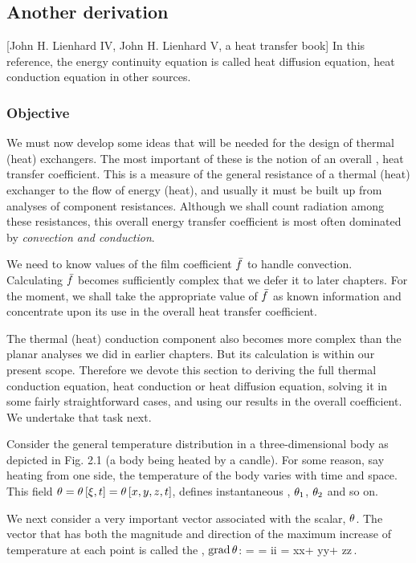 \subsection{Another derivation}
[John H. Lienhard IV, John H. Lienhard V, a heat transfer book] In this reference, the energy continuity equation is called heat diffusion equation, \aka heat conduction equation in other sources.


\subsubsection{Objective}
We must now develop some ideas that will be needed for the design of thermal (heat) exchangers. The most important of these is the notion of an overall , \aka heat transfer coefficient. This is a measure of the general resistance of a thermal (heat) exchanger to the flow of energy (heat), and usually it must be built up from analyses of component resistances. Although we shall count radiation among these resistances, this overall energy transfer coefficient is most often dominated by \emph{convection and conduction}.

We need to know values of the film coefficient $\bar{f}$ to handle convection. Calculating $\bar{f}$ becomes sufficiently complex that we defer it to later chapters. For the moment, we shall take the appropriate value of $\bar{f}$ as known information and concentrate upon its use in the overall heat transfer coefficient.

The thermal (heat) conduction component also becomes more complex than the planar analyses we did in earlier chapters. But its calculation is within our present scope. Therefore we devote this section to deriving the full thermal conduction equation, \aka heat conduction or heat diffusion equation, solving it in some fairly straightforward cases, and using our results in the overall coefficient. We undertake that task next.

Consider the general temperature distribution in a three-dimensional body as depicted in Fig. 2.1 (a body being heated by a candle). For some reason, say heating from one side, the temperature of the body varies with time and space. This field $\theta = \theta\left[{\xi, t}\right] = \theta\left[{x,y,z,t}\right]$, defines instantaneous , $\theta_1$, $\theta_2$ and so on.

We next consider a very important vector associated with the scalar, $\theta$. The vector that has both the magnitude and direction of the maximum increase of temperature at each point is called the , $\operatorname{grad}\theta$:
\beq
\grad\temp = \gder\temp 
           = \rbvec i\igder i\temp 
           = \uvec x\igder x\temp + \uvec y\igder y\temp + \uvec z\igder z\temp\,.
\eeq


